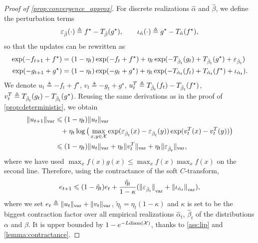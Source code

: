 \begin{proof}[Proof of \autoref{prop:convergence_approx}]
For discrete realizations $\hat \alpha$ and $\hat \beta$, we define the perturbation terms
\begin{equation}
    \epsilon_{\hat \beta}(\cdot) \triangleq
    f^\star - \Ctrans{g^\star}{\hat \beta} ,\qquad
    \iota_{\hat \alpha}(\cdot) \triangleq 
    g^\star - \Ctrans{f^\star}{\hat \alpha},
\end{equation}
so that the updates can be rewritten as
\begin{align}
    \exp(-f_{t+1} + f^\star) &= (1 - \eta_t)
    \exp(-f_{t} + f^\star)
    + \eta_t \exp(-\Ctrans{g_t}{\hat \beta_t} 
    +\Ctrans{g^\star}{\hat \beta_t} + \epsilon_{\hat \beta_t}) \\
    \exp(-g_{t+1} + g^\star) &= (1 - \eta_t)
    \exp(-g_{t} + g^\star)
    + \eta_t \exp(-\Ctrans{f_t}{\hat \alpha_t} 
    +\Ctrans{f^\star}{\hat \alpha_t} + \iota_{\hat \alpha_t}).
\end{align}
We denote $u_t \triangleq -f_{t} + f^\star$, $v_t \triangleq -g_{t} + g^\star$, $u_t^T \triangleq
\Ctrans{f_t}{\hat \beta_t} - \Ctrans{f^\star}{\hat \beta_t}$, $v_t^T \triangleq
\Ctrans{g_t}{\hat \beta_t} - \Ctrans{g^\star}{\hat \beta_t}$. Reusing the same
derivations as in the proof of \autoref{prop:deterministic}, we obtain
    \label{eq:pre_ineq_var}
    \begin{align}
    \Vert u_{t+1} \Vert_{\var} &\leq
    (1 - \eta_t) \Vert u_t \Vert_{\var}
    \\
    &\phantom{=}+ \eta_t \log \big( \max_{x, y \in \Xx}
    \exp(\epsilon_{\hat \beta_t}(x) 
    - \epsilon_{\hat \beta_t}(y)) \exp(v_t^T(x) - v_t^T(y)) \big) \\ 
    &\leq
    (1 - \eta_t) \Vert u_t \Vert_{\var}
    + \eta_t \Vert v_t^T \Vert_{\var}
    + \eta_t \Vert \epsilon_{\hat \beta_t} \Vert_{\var},
\end{align}
where we have used $\max_x f(x) g(x) \leq \max_x f(x) \max_x f(x)$ on the second line. Therefore,
using the contractance of the soft $C$-transform,
\begin{equation}
    \label{eq:ineq_var}
    e_{t+1} \leq 
    (1 - \tilde \eta_t) e_t
    +  \frac{\tilde \eta_t}{1 -\kappa}
    ({\Vert \epsilon_{\hat \beta_t} \Vert}_{\var} + 
    {\Vert \iota_{\hat \alpha_t} \Vert}_{\var}),
\end{equation}
where we set $e_t \triangleq \Vert u_t \Vert_{\var} + \Vert v_t \Vert_{\var}$,
$\tilde \eta_t = \eta_t (1-\kappa)$ and $\kappa$ is set to be the biggest
contraction factor over all empirical realizations $\hat \alpha_t$, $\hat
\beta_t$ of the distributions $\alpha$ and $\beta$. It is upper bounded by $1 -
e^{- L\text{diam}(\Xx)}$, thanks to \autoref{ass:lip} and
\autoref{lemma:contractance}.


\end{proof}
